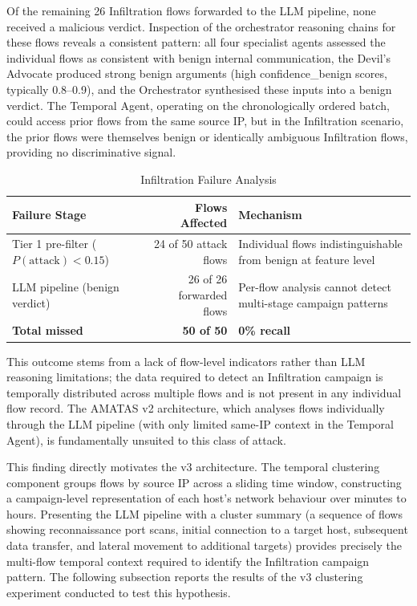 \documentclass[../main.tex]{subfiles}
\begin{document}
Of the remaining 26 Infiltration flows forwarded to the LLM pipeline, none received a malicious verdict. Inspection of the orchestrator reasoning chains for these flows reveals a consistent pattern: all four specialist agents assessed the individual flows as consistent with benign internal communication, the Devil's Advocate produced strong benign arguments (high confidence\_benign scores, typically 0.8--0.9), and the Orchestrator synthesised these inputs into a benign verdict. The Temporal Agent, operating on the chronologically ordered batch, could access prior flows from the same source IP, but in the Infiltration scenario, the prior flows were themselves benign or identically ambiguous Infiltration flows, providing no discriminative signal.

\begin{table}[H]
\centering
\caption{Infiltration Failure Analysis}
\label{tab:infiltration-failure}
\begin{tabularx}{\textwidth}{l r X}
\toprule
Failure Stage & Flows Affected & Mechanism \\
\midrule
Tier 1 pre-filter ($P(\text{attack}) < 0.15$) & 24 of 50 attack flows & Individual flows indistinguishable from benign at feature level \\
LLM pipeline (benign verdict) & 26 of 26 forwarded flows & Per-flow analysis cannot detect multi-stage campaign patterns \\
\midrule
\textbf{Total missed} & \textbf{50 of 50} & \textbf{0\% recall} \\
\bottomrule
\end{tabularx}
\end{table}

This outcome stems from a lack of flow-level indicators rather than LLM reasoning limitations; the data required to detect an Infiltration campaign is temporally distributed across multiple flows and is not present in any individual flow record. The AMATAS v2 architecture, which analyses flows individually through the LLM pipeline (with only limited same-IP context in the Temporal Agent), is fundamentally unsuited to this class of attack.

This finding directly motivates the v3 architecture. The temporal clustering component groups flows by source IP across a sliding time window, constructing a campaign-level representation of each host's network behaviour over minutes to hours. Presenting the LLM pipeline with a cluster summary (a sequence of flows showing reconnaissance port scans, initial connection to a target host, subsequent data transfer, and lateral movement to additional targets) provides precisely the multi-flow temporal context required to identify the Infiltration campaign pattern. The following subsection reports the results of the v3 clustering experiment conducted to test this hypothesis.
\end{document}
